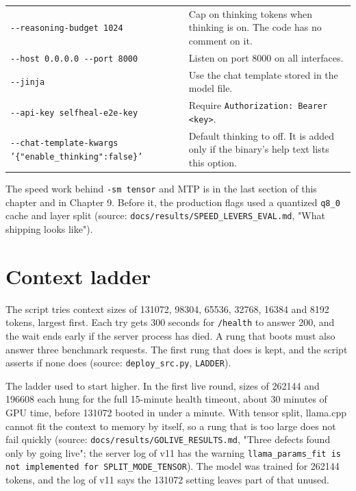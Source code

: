 \documentclass[11pt,a4paper]{report}
\begin{document}
\begin{longtable}{>{\raggedright\arraybackslash}p{0.464\dimexpr\linewidth-4\tabcolsep\relax}>{\raggedright\arraybackslash}p{0.536\dimexpr\linewidth-4\tabcolsep\relax}}
\texttt{-\allowbreak{}-\allowbreak{}reasoning-\allowbreak{}budget 1024} & Cap on thinking tokens when thinking is on. The code has no comment on it. \\
\texttt{-\allowbreak{}-\allowbreak{}host 0.\allowbreak{}0.\allowbreak{}0.\allowbreak{}0 -\allowbreak{}-\allowbreak{}port 8000} & Listen on port 8000 on all interfaces. \\
\texttt{-\allowbreak{}-\allowbreak{}jinja} & Use the chat template stored in the model file. \\
\texttt{-\allowbreak{}-\allowbreak{}api-\allowbreak{}key selfheal-\allowbreak{}e2e-\allowbreak{}key} & Require \texttt{Authorization: Bearer \textless{}key\textgreater{}}. \\
\texttt{-\allowbreak{}-\allowbreak{}chat-\allowbreak{}template-\allowbreak{}kwargs '\{"enable\_\allowbreak{}thinking":false\}'} & Default thinking to off. It is added only if the binary's help text lists this option. \\
\bottomrule
\end{longtable}

The speed work behind \texttt{-\allowbreak{}sm tensor} and MTP is in the last section of this chapter and in Chapter 9. Before it, the production flags used a quantized \texttt{q8\_\allowbreak{}0} cache and layer split (source: \texttt{docs/\allowbreak{}results/\allowbreak{}SPEED\_\allowbreak{}LEVERS\_\allowbreak{}EVAL.\allowbreak{}md}, "What shipping looks like").

\section{Context ladder}

The script tries context sizes of 131072, 98304, 65536, 32768, 16384 and 8192 tokens, largest first. Each try gets 300 seconds for \texttt{/\allowbreak{}health} to answer 200, and the wait ends early if the server process has died. A rung that boots must also answer three benchmark requests. The first rung that does is kept, and the script asserts if none does (source: \texttt{deploy\_\allowbreak{}src.\allowbreak{}py}, \texttt{LADDER}).

The ladder used to start higher. In the first live round, sizes of 262144 and 196608 each hung for the full 15-minute health timeout, about 30 minutes of GPU time, before 131072 booted in under a minute. With tensor split, llama.cpp cannot fit the context to memory by itself, so a rung that is too large does not fail quickly (source: \texttt{docs/\allowbreak{}results/\allowbreak{}GOLIVE\_\allowbreak{}RESULTS.\allowbreak{}md}, "Three defects found only by going live"; the server log of v11 has the warning \texttt{llama\_\allowbreak{}params\_\allowbreak{}fit is not implemented for SPLIT\_\allowbreak{}MODE\_\allowbreak{}TENSOR}). The model was trained for 262144 tokens, and the log of v11 says the 131072 setting leaves part of that unused.
\end{document}
